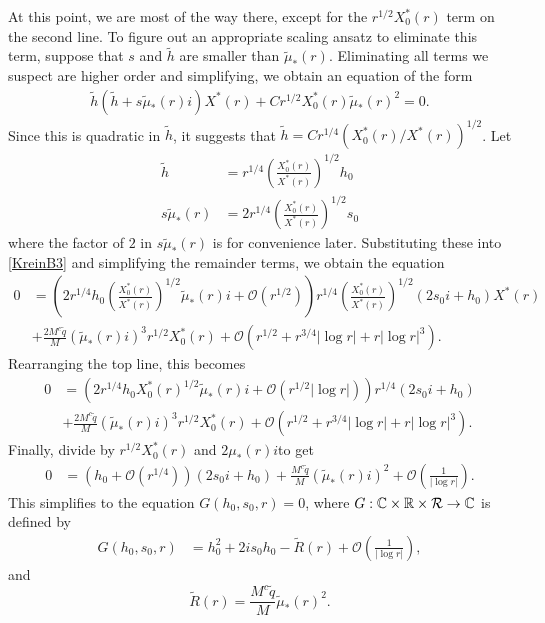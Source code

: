 \documentclass[thesis.tex]{subfiles}
\begin{document}
At this point, we are most of the way there, except for the $r^{1/2}X_0^*(r)$ term on the second line. To figure out an appropriate scaling ansatz to eliminate this term, suppose that $s$ and $\tilde{h}$ are smaller than $\tilde{\mu}_*(r)$. Eliminating all terms we suspect are higher order and simplifying, we obtain an equation of the form
\begin{equation*}
\begin{aligned}
\tilde{h} (\tilde{h} + s \tilde{\mu}_*(r) i) X^*(r) + C r^{1/2} X_0^*(r) \tilde{\mu}_*(r)^2 = 0.
\end{aligned}
\end{equation*} 
Since this is quadratic in $\tilde{h}$, it suggests that $\tilde{h} = C r^{1/4}(X_0^*(r)/X^*(r))^{1/2}$. Let
\begin{align*}
\tilde{h} &= r^{1/4}\left(\frac{X_0^*(r)}{X^*(r)}\right)^{1/2} h_0 \\
s \tilde{\mu}_*(r) &= 2 r^{1/4}\left(\frac{X_0^*(r)}{X^*(r)}\right)^{1/2} s_0
\end{align*}
where the factor of $2$ in $s \tilde{\mu}_*(r)$ is for convenience later. Substituting these into \cref{KreinB3} and simplifying the remainder terms, we obtain the equation
\begin{align*}
0 &= \left( 2 r^{1/4} h_0 \left(\frac{X_0^*(r)}{X^*(r)}\right)^{1/2} \tilde{\mu}_*(r) i  + \mathcal{O}( r^{1/2} )\right) r^{1/4}\left(\frac{X_0^*(r)}{X^*(r)}\right)^{1/2} \left(2 s_0 i + h_0 \right)X^*(r)  \\
&+\frac{2 M^c \tilde{q} }{M} \left(\tilde{\mu}_*(r) i\right)^3 r^{1/2} X_0^*(r) + \mathcal{O}(r^{1/2} + r^{3/4}|\log r| + r |\log r|^3).
\end{align*}
Rearranging the top line, this becomes
\begin{align*}
0 &= \left( 2 r^{1/4} h_0 X_0^*(r)^{1/2} \tilde{\mu}_*(r) i  + \mathcal{O}( r^{1/2} |\log r| )\right) r^{1/4} \left(2 s_0 i + h_0 \right) \\
&+\frac{2 M^c \tilde{q} }{M} \left(\tilde{\mu}_*(r) i\right)^3 r^{1/2} X_0^*(r) + \mathcal{O}(r^{1/2} + r^{3/4}|\log r| + r |\log r|^3).
\end{align*}
Finally, divide by $r^{1/2}X_0^*(r)$ and $2 \mu_*(r) i$to get
\begin{align*}
0 &= \left( h_0 + \mathcal{O}( r^{1/4} )\right) \left(2 s_0 i + h_0 \right) +\frac{M^c \tilde{q} }{M} \left(\tilde{\mu}_*(r) i\right)^2 + \mathcal{O}\left( \frac{1}{|\log r|} \right).
\end{align*}
This simplifies to the equation $G(h_0, s_0, r) = 0$, where $G: \mathbb{C} \times \mathbb{R} \times \mathcal{R} \rightarrow \mathbb{C}$ is defined by
\begin{equation}\label{BsimpleG1}
\begin{aligned}
G(h_0, s_0, r) &= h_0^2 + 2 i s_0 h_0 - \tilde{R}(r) + \mathcal{O}\left( \frac{1}{|\log r|}\right),
\end{aligned}
\end{equation}
and
\[
\tilde{R}(r) = \frac{M^c \tilde{q} }{M} \tilde{\mu}_*(r)^2.
\]
\end{document}
